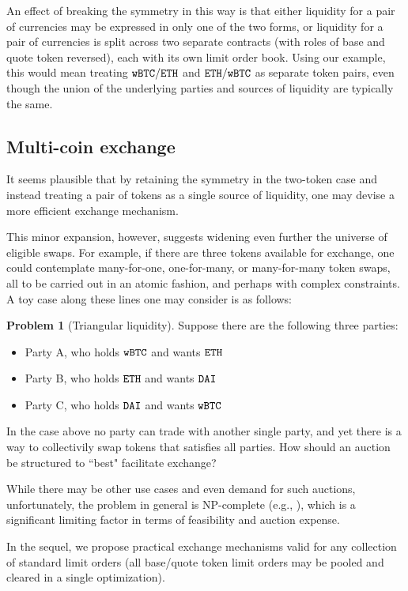 \documentclass[11pt, reqno]{amsart}
\theoremstyle{definition}
\newtheorem{problem}{Problem}[subsection]
\theoremstyle{remark}
\newcommand{\BTC}{\textnormal{\texttt{wBTC}}}
\newcommand{\ETH}{\textnormal{\texttt{ETH}}}
\newcommand{\DAI}{\textnormal{\texttt{DAI}}}
\begin{document}
An effect of breaking the symmetry in this way is that either liquidity for a
pair of currencies may be expressed in only one of the two forms, or liquidity
for a pair of currencies is split across two separate contracts (with roles of
base and quote token reversed), each with its own limit order book.
Using our example, this would mean treating $\BTC/\ETH$ and $\ETH/\BTC$ as
separate token pairs, even though the union of the underlying parties and
sources of liquidity are typically the same.

\subsection{Multi-coin exchange}
It seems plausible that by retaining the symmetry in the two-token case and
instead treating a pair of tokens as a single source of liquidity, one may
devise a more efficient exchange mechanism.

This minor expansion, however, suggests widening even further the universe of
eligible swaps. For example, if there are three tokens available for exchange,
one could contemplate many-for-one, one-for-many, or many-for-many token swaps,
all to be carried out in an atomic fashion, and perhaps with complex
constraints. A toy case along these lines one may consider is as follows:

\begin{problem}[Triangular liquidity]
Suppose there are the following three parties:
\begin{itemize}
	\item Party A, who holds $\BTC$ and wants $\ETH$
	\item Party B, who holds $\ETH$ and wants $\DAI$
	\item Party C, who holds $\DAI$ and wants $\BTC$
\end{itemize}

In the case above no party can trade with another single party, and yet there
is a way to collectivily swap tokens that satisfies all parties.
How should an auction be structured to ``best" facilitate exchange?
\end{problem}
While there may be other use cases and even demand for such auctions,
unfortunately, the problem in general is NP-complete (e.g., \cite{XiStWh05}),
which is a significant limiting factor in terms of feasibility and
auction expense.

In the sequel, we propose practical exchange mechanisms valid for any collection
of standard limit orders (all base/quote token limit orders may be pooled and
cleared in a single optimization).
\end{document}
